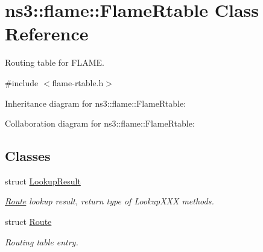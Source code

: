 \hypertarget{classns3_1_1flame_1_1FlameRtable}{}\section{ns3\+:\+:flame\+:\+:Flame\+Rtable Class Reference}
\label{classns3_1_1flame_1_1FlameRtable}


Routing table for F\+L\+A\+ME.  




{\ttfamily \#include $<$flame-\/rtable.\+h$>$}



Inheritance diagram for ns3\+:\+:flame\+:\+:Flame\+Rtable\+:


Collaboration diagram for ns3\+:\+:flame\+:\+:Flame\+Rtable\+:
\subsection*{Classes}
\begin{DoxyCompactItemize}
\item 
struct \hyperlink{structns3_1_1flame_1_1FlameRtable_1_1LookupResult}{Lookup\+Result}
\begin{DoxyCompactList}\small\item\em \hyperlink{structns3_1_1flame_1_1FlameRtable_1_1Route}{Route} lookup result, return type of Lookup\+X\+XX methods. \end{DoxyCompactList}\item 
struct \hyperlink{structns3_1_1flame_1_1FlameRtable_1_1Route}{Route}
\begin{DoxyCompactList}\small\item\em Routing table entry. \end{DoxyCompactList}\end{DoxyCompactItemize}
